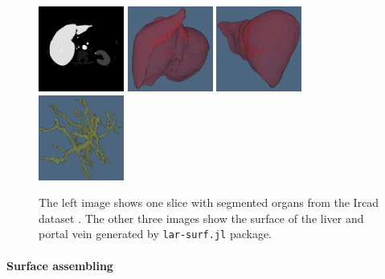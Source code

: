 \begin{figure}
\centering
\includegraphics[width=0.25\textwidth]{figs/ircad01_segmentation_65.png}%
\includegraphics[width=0.25\textwidth]{figs/liver_01_red_3.png}%
\includegraphics[width=0.25\textwidth]{figs/liver_01_red_4.png}%
\includegraphics[width=0.25\textwidth]{figs/portalvein_01_yellow_2.png}%
\caption{
The left image shows one slice 
with segmented organs from 
the Ircad dataset \cite{ircad}. The other three images show the surface of the liver and portal vein generated by \texttt{lar-surf.jl} package.
} \label{fig:liver}
\end{figure}


\paragraph{Surface assembling}

